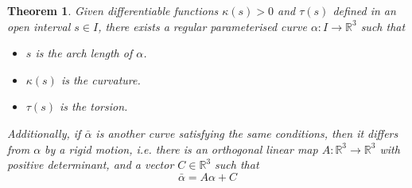 \documentclass{amsart}
\newtheorem{thm}{Theorem}
\begin{document}
\begin{thm}
Given differentiable functions \(\kappa(s)>0\) and \(\tau(s)\) defined in an open interval \(s\in I\), there exists 
a regular parameterised curve \(\alpha : I\to \mathbb{R}^3\) such that
\begin{itemize}
\item \(s\) is the arch length of \(\alpha\).
\item \(\kappa(s)\) is the curvature.
\item \(\tau(s)\) is the torsion.
\end{itemize}

Additionally, if \(\bar{\alpha}\) is another curve satisfying the same conditions, then it differs from \(\alpha\) by a rigid motion, i.e. there is an orthogonal linear map \(A:\mathbb{R}^3 \to \mathbb{R}^3\) with positive determinant, and a vector \(C\in \mathbb{R}^3\) such that
\[\bar{\alpha} = A\alpha + C \]
\end{thm}
\end{document}
